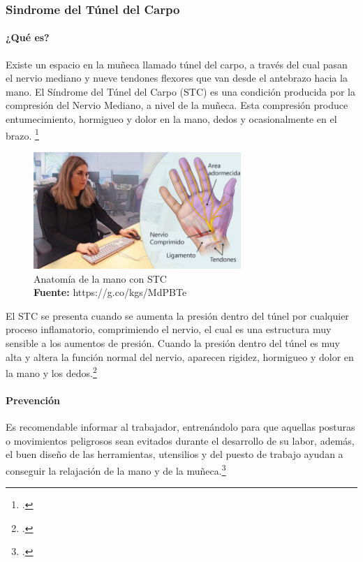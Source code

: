 \subsubsection{Sindrome del Túnel del Carpo}
\paragraph{¿Qué es?}
Existe un espacio en la muñeca llamado túnel del carpo, a través del cual pasan el nervio mediano y nueve tendones flexores que van desde el antebrazo hacia la mano. El Síndrome del Túnel del Carpo (STC) es una condición producida por la compresión del Nervio Mediano, a nivel de la muñeca. Esta compresión produce entumecimiento, hormigueo y dolor en la mano, dedos y ocasionalmente en el brazo. \footcite{SindromeCarpiano}

\begin{figure}[H]
    \centering
    \includegraphics[width=0.7\textwidth]{Anexos/LATEX/chapters/images/STC.jpg}
    \caption{Anatomía de la mano con STC \\\textbf{Fuente:} https://g.co/kgs/MdPBTe}
    \label{STC}
\end{figure}

El STC se presenta cuando se aumenta la presión dentro del túnel por cualquier proceso inflamatorio, comprimiendo el nervio, el cual es una estructura muy sensible a los aumentos de presión. Cuando la presión dentro del túnel es muy alta y altera la función normal del nervio, aparecen rigidez, hormigueo y dolor en la mano y los dedos.\footcite{SindromeCarpiano}
\paragraph{Prevención}
Es recomendable informar al trabajador, entrenándolo para que aquellas posturas o movimientos peligrosos sean evitados durante el desarrollo de su labor, además, el buen diseño de las herramientas, utensilios y del puesto de trabajo ayudan a conseguir la relajación de la mano y de la muñeca.\footcite{SindromeTratarlo}
